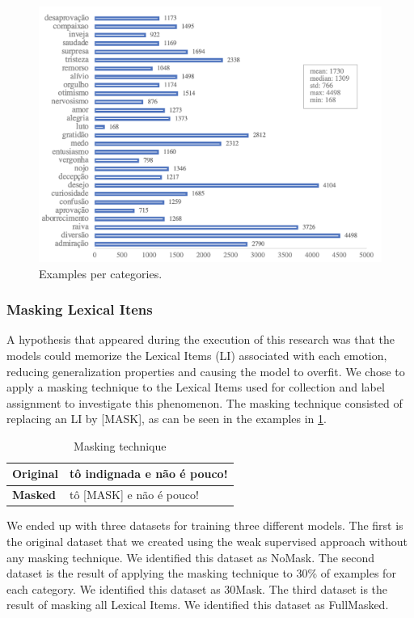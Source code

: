 \documentclass[12pt]{article}
\begin{document}
\begin{figure}[ht]
  \label{fig:example-per-category}
  \caption{Examples per categories.}
  \includegraphics[scale=0.7]{img-n-tables/qt-emotion2.png}
  \centering
\end{figure}

\subsubsection{Masking Lexical Itens}
A hypothesis that appeared during the execution of this research was that the models could memorize the Lexical Items (LI) associated with each emotion, reducing generalization properties and causing the model to overfit. We chose to apply a masking technique to the Lexical Items used for collection and label assignment to investigate this phenomenon. The masking technique consisted of replacing an LI by [MASK], as can be seen in the examples in \ref{tab:example-masked}.

\begin{table}[ht]
  \label{tab:example-masked}
  \caption{Masking technique}
  \begin{tabular}{|l|l|}
    \hline
    \textbf{Original} & tô indignada e não é pouco! \\ \hline
    \textbf{Masked} & tô {[}MASK{]} e não é pouco! \\ \hline
  \end{tabular}
  \centering
\end{table}

We ended up with three datasets for training three different models. The first is the original dataset that we created using the weak supervised approach without any masking technique. We identified this dataset as NoMask. The second dataset is the result of applying the masking technique to 30\% of examples for each category. We identified this dataset as 30Mask. The third dataset is the result of masking all Lexical Items. We identified this dataset as FullMasked.
\end{document}
